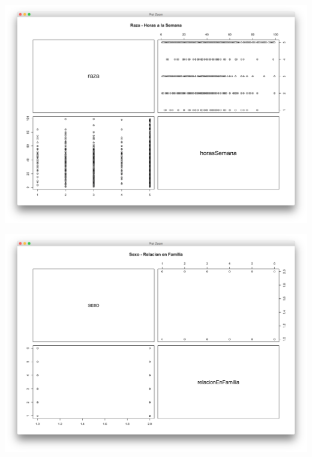 \documentclass{article}
\begin{document}
  \begin{center}
    \hbox{\hspace{-5.5em}\includegraphics[scale=0.45]{graficas/raza-horas}}
  \end{center}
  \begin{center}
    \hbox{\hspace{-5.5em}\includegraphics[scale=0.45]{graficas/Sexo-RelFam}}
  \end{center}
\end{document}
